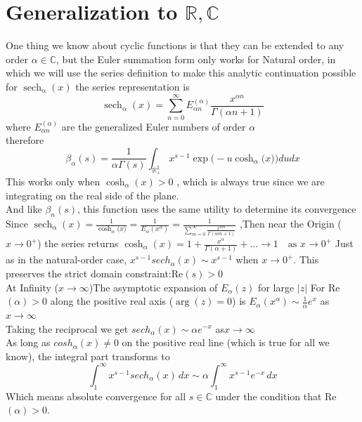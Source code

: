 \documentclass{article}
\DeclareMathOperator{\sech}{sech}
\newcommand{\NotDefinedcosh}[2]{\operatorname{cosh}_{#1}\text{#2}}
\newcommand{\NotDefinedsech}[2]{\operatorname{\sech_{#1}\text{#2}}}
\begin{document}
\section{Generalization to $\mathbb{R},\mathbb{C}$}
One thing we know about cyclic functions is that they can be extended to any order $\alpha\in\mathbb{C}$, but the Euler summation form only works for Natural order, in which we will use the series definition to make this analytic continuation possible \\
for $\NotDefinedsech{\alpha}{}(x)$ the series representation is 
\[\NotDefinedsech{\alpha}{}(x) = \sum_{n=0}^{\infty}E^{(\alpha)}_{\alpha n}\frac{x^{\alpha n}}{\Gamma(\alpha n+1)}\] where $E^{(\alpha)}_{\alpha n}$ are the generalized Euler numbers of order $\alpha$\\
therefore
\[\beta_\alpha(s) = \frac{1}{\alpha\Gamma(s)}\int_{\mathbb{R}_+^{2}}x^{s-1}\exp\big(-u\NotDefinedcosh{\alpha}(x){}\big)dudx \]
This works only when $\NotDefinedcosh{\alpha}{}(x)>0$ , which is always true since we are integrating on the real side of the plane.\\
And like $\beta_n(s)$, this function uses the same utility to determine its convergence\\
Since $\NotDefinedsech{\alpha}{}(x) = \frac{1}{\NotDefinedcosh{\alpha}(x)}=\frac{1}{E_\alpha(x^{\alpha})} = \frac{1}{\sum_{m=0}^\infty \frac{x^{\alpha m}}{\Gamma(\alpha m + 1)}}$ ,Then near the Origin ($x \to 0^+$) the series returns $\NotDefinedcosh{\alpha}{}(x) = 1 + \frac{x^\alpha}{\Gamma(\alpha+1)} + \dots \to 1 \quad \text{as } x \to 0^+$ Just as in the natural-order case, $x^{s-1} sech_\alpha(x) \sim x^{s-1}$ when $x \to 0^+$. This preserves the strict domain constraint:Re$(s) > 0$\\
At Infinity ($x \to \infty$)The asymptotic expansion of  $E_\alpha(z)$ for large $|z|$ For Re$(\alpha) > 0$ along the positive real axis ($\arg(z) = 0$) is $E_\alpha(x^\alpha) \sim \frac{1}{\alpha} e^x $ \cite{Gorenflo2014} as $x \to \infty$\\
Taking the reciprocal we get $sech_\alpha(x) \sim \alpha e^{-x}$ as$ x \to \infty$ \\
As long as $cosh_\alpha(x) \neq 0$ on the positive real line (which is true for all we know), the integral part transforms to
\[\int_1^\infty x^{s-1} sech_\alpha(x) \, dx \sim \alpha \int_1^\infty x^{s-1} e^{-x} \, dx\]
Which means absolute convergence for all $s \in \mathbb{C}$ under the condition that Re$(\alpha) > 0$.
\end{document}

